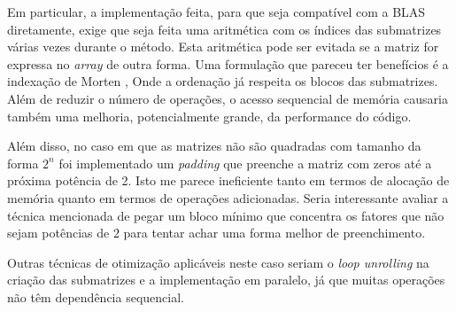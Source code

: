 \documentclass[12pt,a4paper,onecolumn]{article}
\begin{document}
Em particular, a implementação feita, para que seja compatível com a BLAS diretamente, exige que seja feita uma aritmética com os índices das submatrizes várias vezes durante
o método. Esta aritmética pode ser evitada se a matriz for expressa no \emph{array} de outra forma. Uma formulação que pareceu ter benefícios é a indexação de Morten \cite{Huang},
Onde a ordenação já respeita os blocos das submatrizes. Além de reduzir o número de operações, o acesso sequencial de memória causaria também uma melhoria, potencialmente grande,
da performance do código. 

Além disso, no caso em que as matrizes não são quadradas com tamanho da forma $2^n$ foi implementado um \emph{padding} que preenche a matriz com zeros até a próxima potência de 2.
Isto me parece ineficiente tanto em termos de alocação de memória quanto em termos de operações adicionadas. Seria interessante avaliar a técnica mencionada de pegar um bloco mínimo que
concentra os fatores que não sejam potências de $2$ para tentar achar uma forma melhor de preenchimento.

Outras técnicas de otimização aplicáveis neste caso seriam o \emph{loop unrolling} na criação das submatrizes e a implementação em paralelo, já que muitas operações não têm dependência sequencial.



\end{document}
